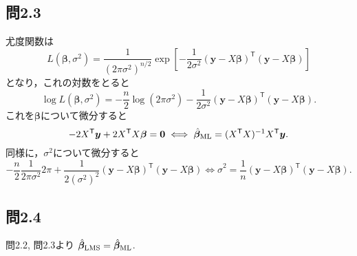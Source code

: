 \documentclass[pdflatex,ja=standard]{bxjsarticle}
\begin{document}
\subsection{問2.3}
尤度関数は
\begin{equation}
L(\bm{\beta}, \sigma^2) = \frac{1}{(2 \pi \sigma^2)^{n/2}} \exp \left[ -\frac{1}{2 \sigma^2} (\bm{y} - X \bm{\beta})^{\mathsf{T}} (\bm{y} - X \bm{\beta}) \right]
\end{equation}
となり，これの対数をとると
\begin{equation}
\log L(\bm{\beta}, \sigma^2) = - \frac{n}{2} \log (2 \pi \sigma^2)  -\frac{1}{2 \sigma^2} (\bm{y} - X \bm{\beta})^{\mathsf{T}} (\bm{y} - X \bm{\beta}) .
\end{equation}
これを$\bm{\beta}$について微分すると
\begin{equation}
- 2 X^{\mathsf{T}} \bm{y} + 2 X^{\mathsf{T}}X \bm{\beta} = \bm{0}
\iff \hat{\bm{\beta}}_{\rm{ML}} = (X^{\mathsf{T}} X)^{-1} X^{\mathsf{T}} \bm{y}.
\end{equation}
同様に，$\sigma^2$について微分すると
\begin{equation}
- \frac{n}{2} \frac{1}{2 \pi \sigma^2}  2 \pi + \frac{1}{2 (\sigma^2)^2} (\bm{y} - X \bm{\beta})^{\mathsf{T}} (\bm{y} - X \bm{\beta})
\iff \hat{\sigma}^2 = \frac{1}{n} (\bm{y} - X \bm{\beta})^{\mathsf{T}} (\bm{y} - X \bm{\beta}).
\end{equation}

\subsection{問2.4}
問2.2, 問2.3より $\hat{\bm{\beta}}_{\rm{LMS}} = \hat{\bm{\beta}}_{\rm{ML}}$. 
\end{document}
